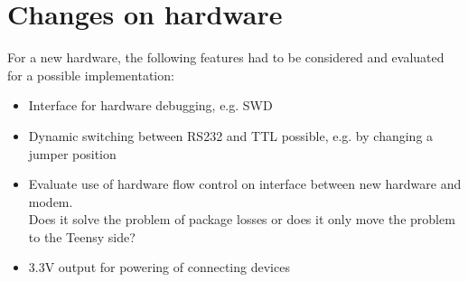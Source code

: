 \section*{Changes on hardware}
For a new hardware, the following features had to be considered and evaluated for a possible implementation:

\begin{itemize}
	\item Interface for hardware debugging, e.g. SWD \\
	\item Dynamic switching between RS232 and TTL possible, e.g. by changing a jumper position \\
	\item Evaluate use of hardware flow control on interface between new hardware and modem. \\
		  Does it solve the problem of package losses or does it only move the problem to the Teensy side? \\
	\item 3.3V output for powering of connecting devices \\
\end{itemize}
